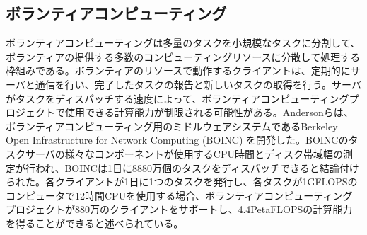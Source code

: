 \subsection{ボランティアコンピューティング}
ボランティアコンピューティングは多量のタスクを小規模なタスクに分割して、ボランティアの提供する多数のコンピューティングリソースに分散して処理する枠組みである。ボランティアのリソースで動作するクライアントは、定期的にサーバと通信を行い、完了したタスクの報告と新しいタスクの取得を行う。サーバがタスクをディスパッチする速度によって、ボランティアコンピューティングプロジェクトで使用できる計算能力が制限される可能性がある。Andersonら\cite{boinc}は、ボランティアコンピューティング用のミドルウェアシステムであるBerkeley Open Infrastructure for Network Computing (BOINC) を開発した。BOINCのタスクサーバの様々なコンポーネントが使用するCPU時間とディスク帯域幅の測定が行われ、BOINCは1日に8880万個のタスクをディスパッチできると結論付けられた。各クライアントが1日に1つのタスクを発行し、各タスクが1GFLOPSのコンピュータで12時間CPUを使用する場合、ボランティアコンピューティングプロジェクトが880万のクライアントをサポートし、4.4PetaFLOPSの計算能力を得ることができると述べられている。
